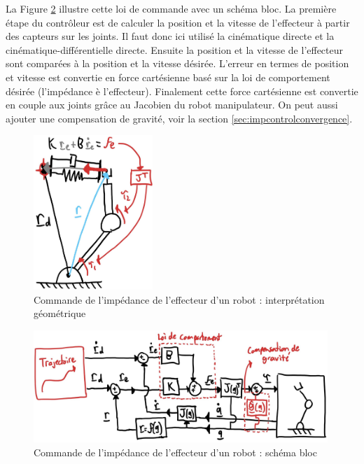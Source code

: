 La Figure \ref{fig:impedanceeffectorbloc} illustre cette loi de commande avec un schéma bloc. La première étape du contrôleur est de calculer la position et la vitesse de l'effecteur à partir des capteurs sur les joints. Il faut donc ici utilisé la cinématique directe et la cinématique-différentielle directe. Ensuite la position et la vitesse de l'effecteur sont comparées à la position et la vitesse désirée. L'erreur en termes de position et vitesse est convertie en force cartésienne basé sur la loi de comportement désirée (l'impédance è l'effecteur). Finalement cette force cartésienne est convertie en couple aux joints grâce au Jacobien du robot manipulateur. On peut aussi ajouter une compensation de gravité, voir la section \ref{sec:impcontrolconvergence}. 
\begin{figure}[H]
	\centering
		\includegraphics[width=0.4\textwidth]{fig/impedanceeffector.jpg}
	\caption{Commande de l'impédance de l'effecteur d'un robot : interprétation géométrique}
	\label{fig:impedanceeffector}
\end{figure}


\begin{figure}[H]
	\centering
		\includegraphics[width=0.99\textwidth]{fig/impedanceeffectorbloc.jpg}
	\caption{Commande de l'impédance de l'effecteur d'un robot : schéma bloc}
	\label{fig:impedanceeffectorbloc}
\end{figure}

